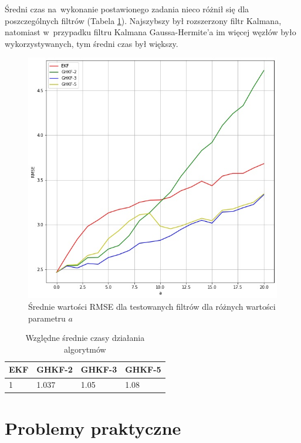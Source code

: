 Średni czas na~wykonanie postawionego zadania nieco różnił się dla poszczególnych filtrów (Tabela \ref{tab:rmse_times}). Najszybszy był rozszerzony filtr Kalmana, natomiast w~przypadku filtru Kalmana Gaussa-Hermite'a im więcej węzłów było wykorzystywanych, tym średni czas był większy.
\begin{figure}[h!]
	\centering
	\includegraphics[width=0.8\linewidth]{rmse_test_results.jpg}
	\caption{Średnie wartości RMSE dla testowanych filtrów dla różnych wartości parametru $a$}
	\label{fig:rmse_test_results}
\end{figure}
\begin{table}[]
	\caption{Względne średnie czasy działania algorytmów}
	\label{tab:rmse_times}
	\begin{center}
		\begin{tabular}{|l|l|l|l|}
			\hline
			\textbf{EKF} & \textbf{GHKF-2} & \textbf{GHKF-3} & \textbf{GHKF-5} \\ 
			\hline
			1 & 1.037 & 1.05 & 1.08 \\
			\hline
		\end{tabular}
	\end{center}
\end{table}

\section{Problemy praktyczne}
\label{sec:practical_problems}


